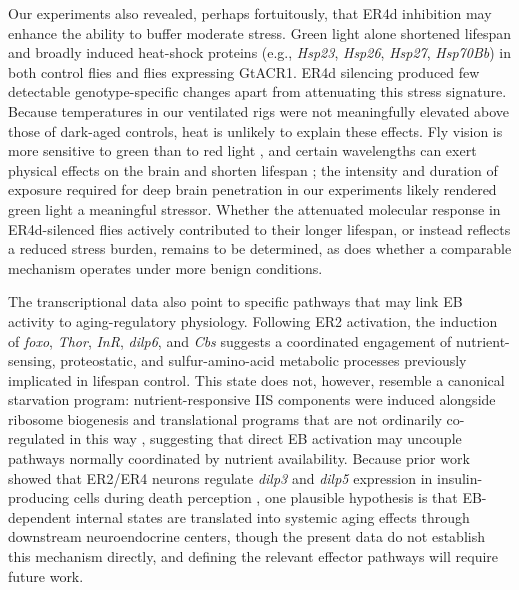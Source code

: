 Our experiments also revealed, perhaps fortuitously, that ER4d inhibition may enhance the ability to buffer moderate stress.
Green light alone shortened lifespan and broadly induced heat-shock proteins (e.g., \textit{Hsp23}, \textit{Hsp26}, \textit{Hsp27}, \textit{Hsp70Bb}) in both control flies and flies expressing GtACR1.
ER4d silencing produced few detectable genotype-specific changes apart from attenuating this stress signature.
Because temperatures in our ventilated rigs were not meaningfully elevated above those of dark-aged controls, heat is unlikely to explain these effects.
Fly vision is more sensitive to green than to red light \citep{salcedo1999}, and certain wavelengths can exert physical effects on the brain \citep{song2022} and shorten lifespan \citep{johnson2023}; the intensity and duration of exposure required for deep brain penetration in our experiments \citep{wolff2015} likely rendered green light a meaningful stressor.
Whether the attenuated molecular response in ER4d-silenced flies actively contributed to their longer lifespan, or instead reflects a reduced stress burden, remains to be determined, as does whether a comparable mechanism operates under more benign conditions.

The transcriptional data also point to specific pathways that may link EB activity to aging-regulatory physiology.
Following ER2 activation, the induction of \textit{foxo}, \textit{Thor}, \textit{InR}, \textit{dilp6}, and \textit{Cbs} suggests a coordinated engagement of nutrient-sensing, proteostatic, and sulfur-amino-acid metabolic processes previously implicated in lifespan control.
This state does not, however, resemble a canonical starvation program: nutrient-responsive IIS components were induced alongside ribosome biogenesis and translational programs that are not ordinarily co-regulated in this way \citep{essers2016}, suggesting that direct EB activation may uncouple pathways normally coordinated by nutrient availability.
Because prior work showed that ER2/ER4 neurons regulate \textit{dilp3} and \textit{dilp5} expression in insulin-producing cells during death perception \citep{gendron2023}, one plausible hypothesis is that EB-dependent internal states are translated into systemic aging effects through downstream neuroendocrine centers, though the present data do not establish this mechanism directly, and defining the relevant effector pathways will require future work.

